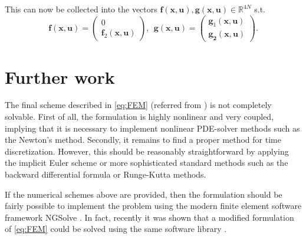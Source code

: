 This can now be collected into the vectors $\mathbf{f}( \mathbf{x}, \mathbf{u}), \mathbf{g}(\mathbf{x},\mathbf{u} ) \in \mathbb{R} ^{4N}  $ s.t. \[
\mathbf{f}( \mathbf{x}, \mathbf{u}) = \begin{pmatrix}
0\\
\mathbf{f}_{2}(\mathbf{x},\mathbf{u} )
\end{pmatrix}
, \ \ \mathbf{g}( \mathbf{x}, \mathbf{u})
 = \begin{pmatrix}
\mathbf{g}_{1}( \mathbf{x}, \mathbf{u}) \\
\mathbf{g_{2}( \mathbf{x}, \mathbf{u}) }
\end{pmatrix}
.
\]





\section{Further work}
The final scheme described in \eqref{eq:FEM} (referred from \cite{kovacs2021convergent}) is not completely solvable. First of all, the formulation is highly nonlinear and very coupled, implying that it is necessary to implement nonlinear PDE-solver methods such as the Newton's method. Secondly, it remains to find a proper method for time discretization. However, this should be reasonably straightforward by applying the implicit Euler scheme or more sophisticated standard methods such as the backward differential formula or Runge-Kutta methods.

If the numerical schemes above are provided, then the formulation should be fairly possible to implement the problem using the modern finite element software framework NGSolve \cite{schoberl2017netgen}. In fact, recently it was shown that a modified formulation of \eqref{eq:FEM} could be solved using the same software library \cite{hu2022evolving}.
